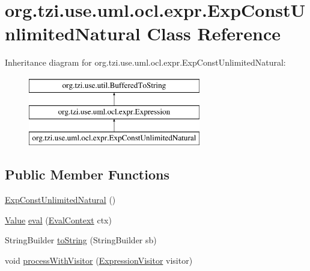 \hypertarget{classorg_1_1tzi_1_1use_1_1uml_1_1ocl_1_1expr_1_1_exp_const_unlimited_natural}{\section{org.\-tzi.\-use.\-uml.\-ocl.\-expr.\-Exp\-Const\-Unlimited\-Natural Class Reference}
\label{classorg_1_1tzi_1_1use_1_1uml_1_1ocl_1_1expr_1_1_exp_const_unlimited_natural}
}
Inheritance diagram for org.\-tzi.\-use.\-uml.\-ocl.\-expr.\-Exp\-Const\-Unlimited\-Natural\-:\begin{figure}[H]
\begin{center}
\leavevmode
\includegraphics[height=3.000000cm]{classorg_1_1tzi_1_1use_1_1uml_1_1ocl_1_1expr_1_1_exp_const_unlimited_natural}
\end{center}
\end{figure}
\subsection*{Public Member Functions}
\begin{DoxyCompactItemize}
\item 
\hyperlink{classorg_1_1tzi_1_1use_1_1uml_1_1ocl_1_1expr_1_1_exp_const_unlimited_natural_a91eb1e552ce9c4e49a035ced8c1c71b1}{Exp\-Const\-Unlimited\-Natural} ()
\item 
\hyperlink{classorg_1_1tzi_1_1use_1_1uml_1_1ocl_1_1value_1_1_value}{Value} \hyperlink{classorg_1_1tzi_1_1use_1_1uml_1_1ocl_1_1expr_1_1_exp_const_unlimited_natural_aa7809a30dbdf98a6746509ea7548660f}{eval} (\hyperlink{classorg_1_1tzi_1_1use_1_1uml_1_1ocl_1_1expr_1_1_eval_context}{Eval\-Context} ctx)
\item 
String\-Builder \hyperlink{classorg_1_1tzi_1_1use_1_1uml_1_1ocl_1_1expr_1_1_exp_const_unlimited_natural_a6207042e4d3a1db278c86a8caa67b99f}{to\-String} (String\-Builder sb)
\item 
void \hyperlink{classorg_1_1tzi_1_1use_1_1uml_1_1ocl_1_1expr_1_1_exp_const_unlimited_natural_a0f7b9592e0529c88b16615f41488b285}{process\-With\-Visitor} (\hyperlink{interfaceorg_1_1tzi_1_1use_1_1uml_1_1ocl_1_1expr_1_1_expression_visitor}{Expression\-Visitor} visitor)
\end{DoxyCompactItemize}

